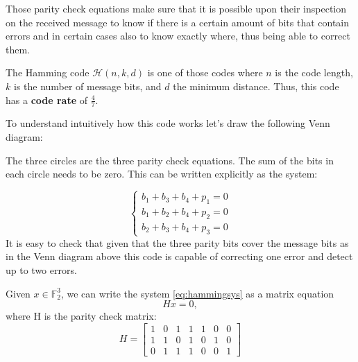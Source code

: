 Those parity check equations make sure that it is possible upon their inspection on the received message to know if there is a certain amount of bits that contain errors and in certain cases also to know exactly where, thus being able to correct them. 

The Hamming code $\mathcal{H}(n, k, d)$ is one of those codes where $n$ is the code length, $k$ is the number of message bits, and $d$ the minimum distance. 
Thus, this code has a \textbf{code rate} of $\frac{4}{7}$.

To understand intuitively how this code works let's draw the following Venn diagram:
\def\firstcircle{(90:1.75cm) circle (2.5cm)}
\def\secondcircle{(210:1.75cm) circle (2.5cm)}
\def\thirdcircle{(330:1.75cm) circle (2.5cm)}
\begin{center}
\end{center}

The three circles are the three parity check equations. The sum of the bits in each circle needs to be zero. This can be written explicitly as the system:

\begin{equation}
	\begin{cases}
		b_1 + b_3 + b_4 +p_1 = 0 \\
		b_1 + b_2 + b_4 +p_2 = 0 \\
		b_2 + b_3 + b_4 +p_3 = 0
	\end{cases}
	\label{eq:hammingsys}
\end{equation}
It is easy to check that given that the three parity bits cover the message bits as in the Venn diagram above this code is capable of correcting one error and detect up to two errors.

Given $x \in \mathbb{F}^3_2 $, we can write the system \ref{eq:hammingsys} as a matrix equation
\begin{equation}
Hx = 0,
\end{equation}
where H is the parity check matrix:
\begin{equation}
H = \left[\begin{matrix}
1 & 0 & 1 & 1 & 1 & 0 & 0 \\
1 & 1 & 0 & 1 & 0 & 1 & 0 \\
0 & 1 & 1 & 1 & 0 & 0 & 1
\end{matrix} \right]
\end{equation}

